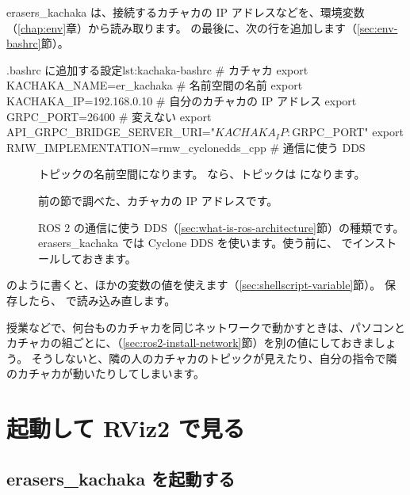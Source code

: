 erasers\_kachaka は、接続するカチャカの IP アドレスなどを、環境変数（\ref{chap:env}章）から読み取ります。
 の最後に、次の行を追加します（\ref{sec:env-bashrc}節）。

\begin{codelisting}[style=bash]{.bashrc に追加する設定}{lst:kachaka-bashrc}
# カチャカ
export KACHAKA_NAME=er_kachaka                  # 名前空間の名前
export KACHAKA_IP=192.168.0.10                  # 自分のカチャカの IP アドレス
export GRPC_PORT=26400                          # 変えない
export API_GRPC_BRIDGE_SERVER_URI="${KACHAKA_IP}:${GRPC_PORT}"
export RMW_IMPLEMENTATION=rmw_cyclonedds_cpp    # 通信に使う DDS
\end{codelisting}

\begin{description}
  \item[] トピックの名前空間になります。 なら、トピックは  になります。
  \item[] 前の節で調べた、カチャカの IP アドレスです。
  \item[] ROS 2 の通信に使う DDS（\ref{sec:what-is-ros-architecture}節）の種類です。erasers\_kachaka では Cyclone DDS を使います。使う前に、 でインストールしておきます。
\end{description}

 のように書くと、ほかの変数の値を使えます（\ref{sec:shellscript-variable}節）。
保存したら、 で読み込み直します。

\begin{point}[複数のカチャカを同じネットワークで使うとき]
  授業などで、何台ものカチャカを同じネットワークで動かすときは、パソコンとカチャカの組ごとに、（\ref{sec:ros2-install-network}節）を別の値にしておきましょう。
  そうしないと、隣の人のカチャカのトピックが見えたり、自分の指令で隣のカチャカが動いたりしてしまいます。
\end{point}

\section{起動して RViz2 で見る}
\label{sec:kachaka-bringup}

\subsection{erasers\_kachaka を起動する}

